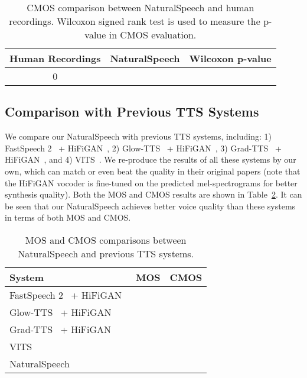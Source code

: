 \documentclass{article}
\theoremstyle{definition}
\def\myname{NaturalSpeech}
\begin{document}
\begin{table}[h!]
\caption{CMOS comparison between \myname{} and human recordings. Wilcoxon signed rank test is used to measure the p-value in CMOS evaluation.}
\centering
\begin{tabular}{ccc}
	\toprule
	Human Recordings &\myname{} & Wilcoxon p-value \\
	\midrule
	0 &  &  \\
	\bottomrule
\end{tabular}
\label{tab_cmos_recording}
\end{table}


\subsection{Comparison with Previous TTS Systems}
We compare our \myname{} with previous TTS systems, including: 1) FastSpeech 2~\citep{ren2021fastspeech} + HiFiGAN~\citep{kong2020hifi}, 2) Glow-TTS~\citep{kim2020glow} + HiFiGAN~\citep{kong2020hifi}, 3) Grad-TTS~\citep{popov2021grad} + HiFiGAN~\citep{kong2020hifi}, and 4) VITS~\citep{kim2021conditional}. We re-produce the results of all these systems by our own, which can match or even beat the quality in their original papers (note that the HiFiGAN vocoder is fine-tuned on the predicted mel-spectrograms for better synthesis quality). Both the MOS and CMOS results are shown in Table~\ref{tab_mos_previous_system}.  It can be seen that our \myname{} achieves better voice quality than these systems in terms of both MOS and CMOS. 


\begin{table}[h!]
\caption{MOS and CMOS comparisons between \myname{} and previous TTS systems.}
\centering
\begin{tabular}{ l | l | c }
    \toprule
	    System & MOS & CMOS \\
	    \midrule
	    FastSpeech 2~\citep{ren2021fastspeech} + HiFiGAN~\citep{kong2020hifi} &  &  \\
	    Glow-TTS~\citep{kim2020glow} + HiFiGAN~\citep{kong2020hifi} &  &  \\
	    Grad-TTS~\citep{popov2021grad} + HiFiGAN~\citep{kong2020hifi}  &   &  \\
	    VITS~\citep{kim2021conditional} &   &  \\
	    \midrule
	    \myname{} &  &  \\
		\bottomrule
	\end{tabular}
	\label{tab_mos_previous_system}
\end{table}
\end{document}
